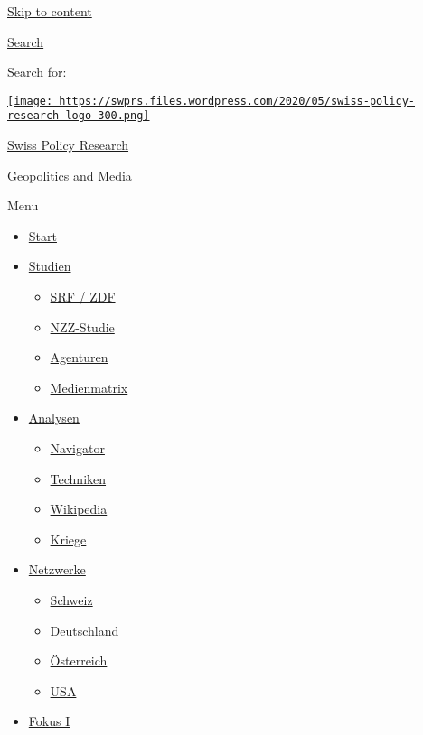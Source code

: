 \protect\hyperlink{content}{Skip to content}

\href{https://swprs.org/}{}

\protect\hyperlink{search-container}{Search}

Search for:

\href{https://swprs.org/}{\texttt{[image: https://swprs.files.wordpress.com/2020/05/swiss-policy-research-logo-300.png]}}

\href{https://swprs.org/}{Swiss Policy Research}

Geopolitics and Media

Menu

\begin{itemize}
\tightlist
\item
  \href{https://swprs.org}{Start}
\item
  \href{https://swprs.org/srf-propaganda-analyse/}{Studien}

  \begin{itemize}
  \tightlist
  \item
    \href{https://swprs.org/srf-propaganda-analyse/}{SRF / ZDF}
  \item
    \href{https://swprs.org/die-nzz-studie/}{NZZ-Studie}
  \item
    \href{https://swprs.org/der-propaganda-multiplikator/}{Agenturen}
  \item
    \href{https://swprs.org/die-propaganda-matrix/}{Medienmatrix}
  \end{itemize}
\item
  \href{https://swprs.org/medien-navigator/}{Analysen}

  \begin{itemize}
  \tightlist
  \item
    \href{https://swprs.org/medien-navigator/}{Navigator}
  \item
    \href{https://swprs.org/der-propaganda-schluessel/}{Techniken}
  \item
    \href{https://swprs.org/propaganda-in-der-wikipedia/}{Wikipedia}
  \item
    \href{https://swprs.org/logik-imperialer-kriege/}{Kriege}
  \end{itemize}
\item
  \href{https://swprs.org/netzwerk-medien-schweiz/}{Netzwerke}

  \begin{itemize}
  \tightlist
  \item
    \href{https://swprs.org/netzwerk-medien-schweiz/}{Schweiz}
  \item
    \href{https://swprs.org/netzwerk-medien-deutschland/}{Deutschland}
  \item
    \href{https://swprs.org/medien-in-oesterreich/}{Österreich}
  \item
    \href{https://swprs.org/das-american-empire-und-seine-medien/}{USA}
  \end{itemize}
\item
  \href{https://swprs.org/bericht-eines-journalisten/}{Fokus I}


\end{itemize}
